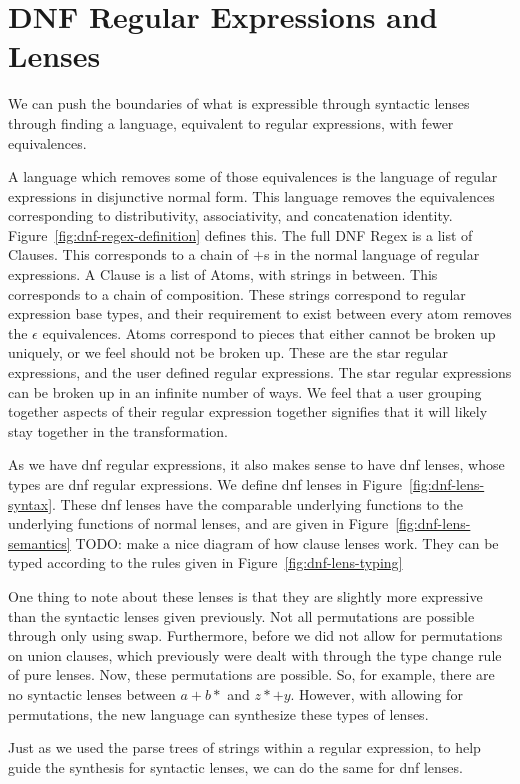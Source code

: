 \section{DNF Regular Expressions and Lenses}
We can push the boundaries of what is expressible through syntactic lenses
through finding a language, equivalent to regular expressions, with fewer
equivalences.


A language which removes some of those equivalences is the language of regular
expressions in disjunctive normal form.  This language removes the
equivalences corresponding to distributivity, associativity, and concatenation identity.
Figure~\ref{fig:dnf-regex-definition} defines this.
The full DNF Regex is a list of Clauses.  This corresponds to a chain of $+$s
in the normal language of regular expressions.
A Clause is a list of Atoms, with strings in between.
This corresponds to a chain of composition.  These strings
correspond to regular expression base types, and their requirement to
exist between every atom removes the $\epsilon$ equivalences.
Atoms correspond to pieces that either cannot be broken up uniquely, or we feel should not be broken up.
These are the star regular expressions, and the user defined regular expressions.
The star regular expressions can be broken up in an infinite number of ways.
We feel that a user grouping together aspects of their regular expression together
signifies that it will likely stay together in the transformation.




As we have dnf regular expressions, it also makes sense to have dnf lenses,
whose types are dnf regular expressions.  We define dnf lenses in Figure~\ref{fig:dnf-lens-syntax}.
These dnf lenses have the comparable underlying functions to the underlying functions
of normal lenses, and are given in Figure~\ref{fig:dnf-lens-semantics}
TODO: make a nice diagram of how clause lenses work.
They can be typed according to the rules given in Figure~\ref{fig:dnf-lens-typing}

One thing to note about these lenses is that they are slightly more expressive
than the syntactic lenses given previously.
Not all permutations are possible through only using swap.
Furthermore, before we did not allow for permutations on union clauses,
which previously were dealt with through the type change rule of pure lenses.
Now, these permutations are possible.  So, for example, there are no syntactic lenses
between $a+b*$ and $z*+y$.  However, with allowing for permutations, the new
language can synthesize these types of lenses.

Just as we used the parse trees of strings within a regular expression,
to help guide the synthesis for syntactic lenses, we can do the same
for dnf lenses.
